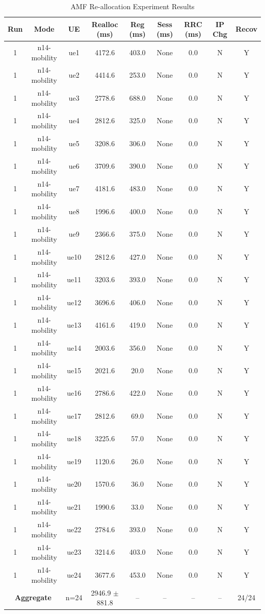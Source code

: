 \begin{table}[ht]
\centering
\begin{tabular}{|c|c|c|c|c|c|c|c|c|}
\hline
Run & Mode & UE & Realloc (ms) & Reg (ms) & Sess (ms) & RRC (ms) & IP Chg & Recov \\
\hline
1 & n14-mobility & ue1 & 4172.6 & 403.0 & None & 0.0 & N & Y \\
1 & n14-mobility & ue2 & 4414.6 & 253.0 & None & 0.0 & N & Y \\
1 & n14-mobility & ue3 & 2778.6 & 688.0 & None & 0.0 & N & Y \\
1 & n14-mobility & ue4 & 2812.6 & 325.0 & None & 0.0 & N & Y \\
1 & n14-mobility & ue5 & 3208.6 & 306.0 & None & 0.0 & N & Y \\
1 & n14-mobility & ue6 & 3709.6 & 390.0 & None & 0.0 & N & Y \\
1 & n14-mobility & ue7 & 4181.6 & 483.0 & None & 0.0 & N & Y \\
1 & n14-mobility & ue8 & 1996.6 & 400.0 & None & 0.0 & N & Y \\
1 & n14-mobility & ue9 & 2366.6 & 375.0 & None & 0.0 & N & Y \\
1 & n14-mobility & ue10 & 2812.6 & 427.0 & None & 0.0 & N & Y \\
1 & n14-mobility & ue11 & 3203.6 & 393.0 & None & 0.0 & N & Y \\
1 & n14-mobility & ue12 & 3696.6 & 406.0 & None & 0.0 & N & Y \\
1 & n14-mobility & ue13 & 4161.6 & 419.0 & None & 0.0 & N & Y \\
1 & n14-mobility & ue14 & 2003.6 & 356.0 & None & 0.0 & N & Y \\
1 & n14-mobility & ue15 & 2021.6 & 20.0 & None & 0.0 & N & Y \\
1 & n14-mobility & ue16 & 2786.6 & 422.0 & None & 0.0 & N & Y \\
1 & n14-mobility & ue17 & 2812.6 & 69.0 & None & 0.0 & N & Y \\
1 & n14-mobility & ue18 & 3225.6 & 57.0 & None & 0.0 & N & Y \\
1 & n14-mobility & ue19 & 1120.6 & 26.0 & None & 0.0 & N & Y \\
1 & n14-mobility & ue20 & 1570.6 & 36.0 & None & 0.0 & N & Y \\
1 & n14-mobility & ue21 & 1990.6 & 33.0 & None & 0.0 & N & Y \\
1 & n14-mobility & ue22 & 2784.6 & 393.0 & None & 0.0 & N & Y \\
1 & n14-mobility & ue23 & 3214.6 & 403.0 & None & 0.0 & N & Y \\
1 & n14-mobility & ue24 & 3677.6 & 453.0 & None & 0.0 & N & Y \\
\multicolumn{2}{|c|}{\textbf{Aggregate}} & n=24 & 2946.9 $\pm$ 881.8 & -- & -- & -- & -- & 24/24 \\
\hline
\end{tabular}
\caption{AMF Re-allocation Experiment Results}
\label{tab:amf_realloc}
\end{table}
